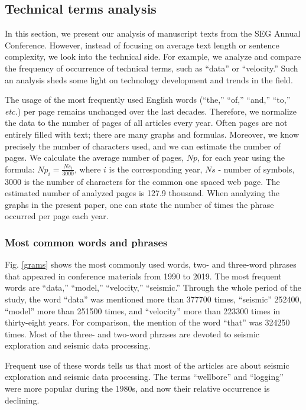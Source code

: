 \documentclass[geosciences,article,submit,moreauthors,pdftex]{Definitions/mdpi}
\begin{document}
\subsection{Technical terms analysis}
In this section, we present our analysis of manuscript texts from the SEG Annual Conference. However, instead of focusing on average text length or sentence complexity, we look into the technical side. For example, we analyze and compare the frequency of occurrence of technical terms, such as ``data'' or ``velocity.'' Such an analysis sheds some light on technology development and trends in the field.

The usage of the most frequently used English words (``the,'' ``of,'' ``and,'' ``to,'' \textit{etc.}) per page remains unchanged over the last decades. Therefore, we normalize the data to the number of pages of all articles every year. Often pages are not entirely filled with text; there are many graphs and formulas. Moreover, we know precisely the number of characters used, and we can estimate the number of pages.
We calculate the average number of pages, $Np$, for each year using the formula: $Np_i = \frac{Ns_i}{3000}$, where $i$ is the corresponding year, $Ns$ - number of symbols, 3000 is the number of characters for the common one spaced web page. The estimated number of analyzed pages is 127.9 thousand.
When analyzing the graphs in the present paper, one can state the number of times the phrase occurred per page each year.

\subsubsection{Most common words and phrases}
Fig. \ref{grams} shows the most commonly used words, two- and three-word phrases that appeared in conference materials from 1990 to 2019. The most frequent words are ``data,'' ``model,'' ``velocity,'' ``seismic.'' Through the whole period of the study, the word ``data'' was mentioned more than 377700 times, ``seismic'' 252400, ``model'' more than 251500 times, and ``velocity'' more than 223300 times in thirty-eight years. For comparison, the mention of the word ``that'' was 324250 times. Most of the three- and two-word phrases are devoted to seismic exploration and seismic data processing. 

Frequent use of these words tells us that most of the articles are about seismic exploration and seismic data processing. The terms ``wellbore'' and ``logging'' were more popular during the 1980s, and now their relative occurrence is declining. 
\end{document}
